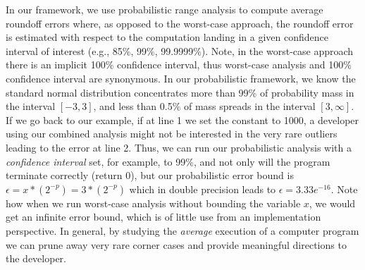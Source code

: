 In our framework, we use probabilistic range analysis to compute average roundoff errors where, as opposed to the worst-case approach, the roundoff error is estimated with respect to the computation landing in a given confidence interval of interest (e.g., 85\%, 99\%, 99.9999\%).
%
Note, in the worst-case approach there is an implicit 100\% confidence interval, thus worst-case analysis and 100\% confidence interval are synonymous.
%
In our probabilistic framework, we know the standard normal distribution concentrates more than 99\% of probability mass in the interval $[-3, 3]$, and less than 0.5\% of mass spreads in the interval $[3, \infty]$.
%
If we go back to our example, if at line 1 we set the constant to 1000, a developer using our combined analysis might not be interested in the very rare outliers leading to the error at line 2.
%
Thus, we can run our probabilistic analysis with a \emph{confidence interval} set, for example, to 99\%, and not only will the program terminate correctly (return 0), but our probabilistic error bound is $\epsilon = x*(2^{-p}) = 3*(2^{-p})$ which in double precision leads to $\epsilon = 3.33e^{-16}$.
%
Note how when we run worst-case analysis without bounding the variable $x$, we would get an infinite error bound, which is of little use from an implementation perspective. 
%
In general, by studying the \emph{average} execution of a computer program we can prune away very rare corner cases and provide meaningful directions to the developer.
%
\newpage



%
%
%

%
%

